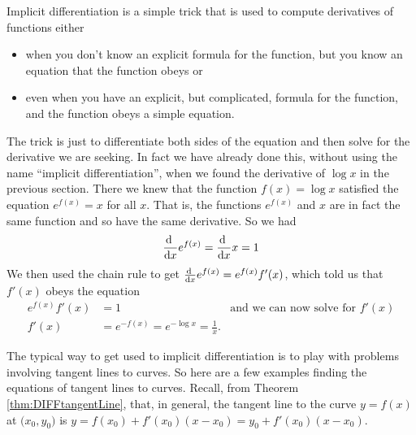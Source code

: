 Implicit differentiation is a simple trick that is used to
compute derivatives of functions either
\begin{itemize}
\item when you don't know an explicit formula for the function, but you
know an equation that the function obeys or

\item even when you have an explicit, but complicated, formula for the
function, and the function obeys a simple equation.
\end{itemize}
The trick is just to differentiate both sides of the equation and
then solve for the derivative we are seeking. In fact we have already done
this, without using the name ``implicit differentiation'', when we found the
derivative of $\log x$ in the previous section. There we knew that the function
$f(x)=\log x$ satisfied the equation $e^{f(x)}=x$ for all $x$. That is, the
functions $e^{f(x)}$ and $x$ are in fact the same function and so have the same
derivative. So we had
\begin{align*}
\diff{}{x}e^{f(x)} = \diff{}{x}x = 1
\end{align*}
We then used the chain rule to get $\diff{}{x}e^{f(x)}=e^{f(x)}f'(x)$,
which told us that $f'(x)$ obeys the equation
\begin{align*}
e^{f(x)}f'(x) &=1 & \text{and we can now solve for $f'(x)$}\\
f'(x) &= e^{-f(x)} = e^{-\log x} = \frac{1}{x}.
\end{align*}

The typical way to get used to implicit differentiation is to play with
problems involving tangent lines to curves. So here are a few examples
finding the equations of tangent lines to curves. Recall, from Theorem
\ref{thm:DIFFtangentLine}, that, in general, the tangent line to the curve
$y=f(x)$ at $\big(x_0,y_0\big)$ is $y=f(x_0)+f'(x_0)(x-x_0)=y_0+f'(x_0)(x-x_0)$.


